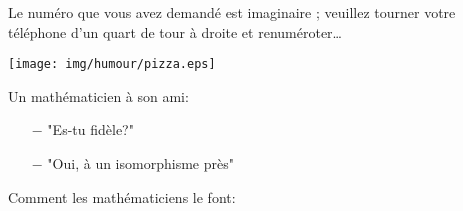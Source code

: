 	\begin{center}\underline{\hspace{5 cm}}\end{center}
	
	Le numéro que vous avez demandé est imaginaire ; veuillez tourner votre téléphone d'un quart de tour à droite et renuméroter…
	
	\begin{center}\underline{\hspace{5 cm}}\end{center}
	
	\begin{center}
		\texttt{[image: img/humour/pizza.eps]}	
	\end{center}
	\begin{center}\underline{\hspace{5 cm}}\end{center}
	
	Un mathématicien à son ami:

\begin{itemize}	 
	\item[$-$] "Es-tu fidèle?"

	\item[$-$] "Oui, à un isomorphisme près"
\end{itemize}

	\begin{center}\underline{\hspace{5 cm}}\end{center}
	
Comment les mathématiciens le font:

